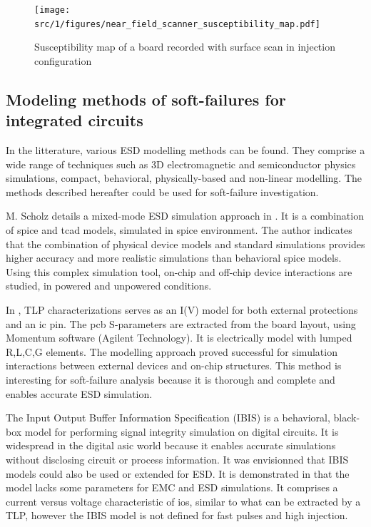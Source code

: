 \begin{figure}[!h]
  \centering
  \texttt{[image: src/1/figures/near\_field\_scanner\_susceptibility\_map.pdf]}
  \caption{Susceptibility map of a board recorded with surface scan in injection configuration \cite{}}
  \label{fig:near-field-scan-map}
\end{figure}


\subsection{Modeling methods of soft-failures for integrated circuits}

In the litterature, various ESD modelling methods can be found.
They comprise a wide range of techniques such as 3D electromagnetic and semiconductor physics simulations, compact, behavioral, physically-based and non-linear modelling.
The methods described hereafter could be used for soft-failure investigation.

M. Scholz details a mixed-mode ESD simulation approach in \cite{mixedModeESDSims}.
It is a combination of \gls{spice} and \gls{tcad} models, simulated in \gls{spice} environment.
The author indicates that the combination of physical device models and standard simulations provides higher accuracy and more realistic simulations than behavioral \gls{spice} models.
Using this complex simulation tool, on-chip and off-chip device interactions are studied, in powered and unpowered conditions.

In \cite{usb2ESDProtection}, TLP characterizations serves as an I(V) model for both external protections and an \gls{ic} pin.
The \gls{pcb} S-parameters are extracted from the board layout, using Momentum software (Agilent Technology).
It is electrically model with lumped R,L,C,G elements.
The modelling approach proved successful for simulation interactions between external devices and on-chip structures.
This method is interesting for soft-failure analysis because it is thorough and complete and enables accurate ESD simulation.

The Input Output Buffer Information Specification (IBIS) \cite{ibis-spec} is a behavioral, black-box model for performing signal integrity simulation on digital circuits.
It is widespread in the digital \gls{asic} world because it enables accurate simulations without disclosing circuit or process information.
It was envisionned that IBIS models could also be used or extended for ESD.
It is demonstrated in \cite{ibisImprovementFabrice} that the model lacks some parameters for EMC and ESD simulations.
It comprises a current versus voltage characteristic of \gls{io}s, similar to what can be extracted by a TLP, however the IBIS model is not defined for fast pulses and high injection.

